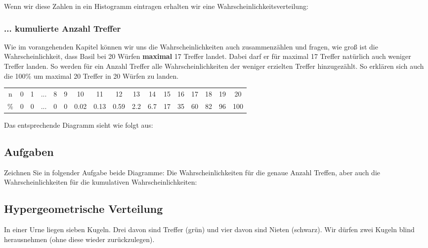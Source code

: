 Wenn wir diese Zahlen in ein Histogramm eintragen erhalten wir eine
Wahrscheinlichkeitsverteilung:




\subsubsection{... kumulierte Anzahl Treffer}
Wie im vorangehenden Kapitel können wir uns die Wahrscheinlichkeiten
auch zusammenzählen und \zB fragen, wie groß ist die
Wahrscheinlichkeit, dass Basil bei 20 Würfen \textbf{maximal} 17
Treffer landet. Dabei darf er für maximal 17 Treffer natürlich auch
weniger Treffer landen. So werden für ein Anzahl Treffer alle
Wahrscheinlichkeiten der weniger erzielten Treffer hinzugezählt. So
erklären sich auch die 100\% um maximal 20 Treffer in 20 Würfen zu
landen.

\begin{tabular}{c|cccccccccccccccc}
  n  & 0 & 1 & ... & 8 & 9 & 10  & 11   & 12   & 13  & 14  & 15 & 16 &  17 & 18 & 19 &  20\\
  \% & 0 & 0 & ... & 0 & 0 &  0.02  &0.13   & 0.59 & 2.2 & 6.7 & 17 & 35 &  60 & 82 & 96 & 100
\end{tabular}

Das entsprechende Diagramm sieht wie folgt aus:

\newpage

\subsection*{Aufgaben}

Zeichnen Sie in folgender Aufgabe beide Diagramme: Die
Wahrscheinlichkeiten für die genaue Anzahl Treffen, aber auch die
Wahrscheinlichkeiten für die kumulativen Wahrscheinlichkeiten:


\newpage

\subsection{Hypergeometrische Verteilung}
In einer Urne liegen sieben Kugeln. Drei davon sind Treffer (grün) und vier davon sind Nieten (schwarz).
Wir dürfen zwei Kugeln blind herausnehmen (ohne diese wieder zurückzulegen).

